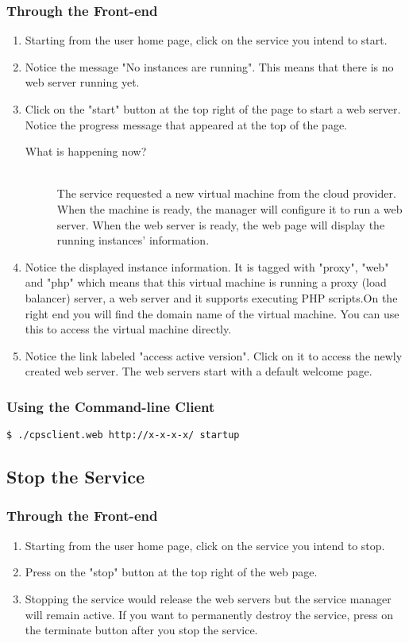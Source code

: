 \documentclass[12pt]{article}
\newenvironment{what}
{\begin{description} \item [What is happening now?] \hfill \\}
{\end{description}}
\newenvironment{framedbox}[1]%
{\begin{framed}
 \begingroup
 \fontsize{#1}{#1}\selectfont
}
{
 \endgroup
 \end{framed}
}
\begin{document}
\subsubsection{Through the Front-end}
\begin{enumerate}
\item Starting from the user home page, click on the service you intend to start.
\item Notice the message "No instances are running". This means that there is no
      web server running yet.
\item Click on the "start" button at the top right
      of the page to start a web server. Notice the progress message that
      appeared at the top of the page.
      \begin{what}
        The service requested a new virtual machine from the cloud provider.
        When the machine is ready, the manager will configure it to run
        a web server. When the web server is ready, the web page will
        display the running instances' information.
      \end{what}
\item Notice the displayed instance information. It is tagged with "proxy",
      "web" and "php" which means that this virtual machine is running a proxy
      (load balancer) server, a web server and it supports executing PHP
      scripts.On the right end you will find the domain name of the virtual
      machine. You can use this to access the virtual machine directly.
\item Notice the link labeled "access active version". Click on it to access
      the newly created web server. The web servers start with a default
      welcome page.
\end{enumerate}

\subsubsection{Using the Command-line Client}
\begin{framedbox}{8pt}\begin{verbatim}
$ ./cpsclient.web http://x-x-x-x/ startup
\end{verbatim}\end{framedbox}


\subsection{Stop the Service}
\subsubsection{Through the Front-end}
\begin{enumerate}
\item Starting from the user home page, click on the service you intend to stop.
\item Press on the "stop" button at the top right of the web page.
\item Stopping the service would release the web servers but the service
      manager will remain active. If you want to permanently destroy the
      service, press on the terminate button after you stop the service.
\end{enumerate}
\end{document}
